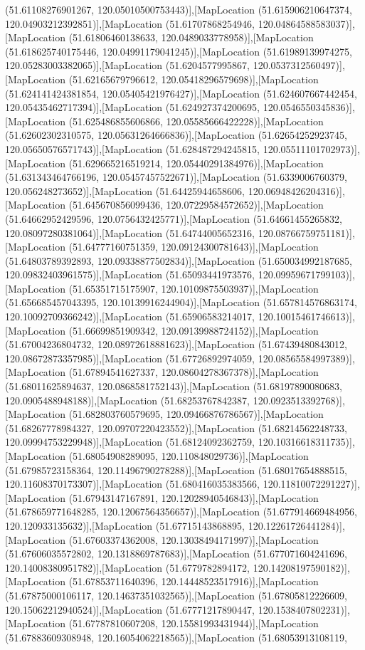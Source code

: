 (51.61108276901267, 120.05010500753443)],[MapLocation (51.615906210647374, 120.04903212392851)],[MapLocation (51.61707868254946, 120.04864588583037)],[MapLocation (51.61806460138633, 120.0489033778958)],[MapLocation (51.618625740175446, 120.04991179041245)],[MapLocation (51.61989139974275, 120.05283003382065)],[MapLocation (51.6204577995867, 120.0537312560497)],[MapLocation (51.62165679796612, 120.05418296579698)],[MapLocation (51.624141424381854, 120.05405421976427)],[MapLocation (51.624607667442454, 120.05435462717394)],[MapLocation (51.624927374200695, 120.0546550345836)],[MapLocation (51.625486855606866, 120.05585666422228)],[MapLocation (51.62602302310575, 120.05631264666836)],[MapLocation (51.62654252923745, 120.05650576571743)],[MapLocation (51.628487294245815, 120.05511101702973)],[MapLocation (51.629665216519214, 120.05440291384976)],[MapLocation (51.631343464766196, 120.05457457522671)],[MapLocation (51.6339006760379, 120.056248273652)],[MapLocation (51.64425944658606, 120.06948426204316)],[MapLocation (51.645670856099436, 120.07229584572652)],[MapLocation (51.64662952429596, 120.0756432425771)],[MapLocation (51.64661455265832, 120.08097280381064)],[MapLocation (51.64744005652316, 120.08766759751181)],[MapLocation (51.64777160751359, 120.09124300781643)],[MapLocation (51.64803789392893, 120.09338877502834)],[MapLocation (51.650034992187685, 120.09832403961575)],[MapLocation (51.65093441973576, 120.09959671799103)],[MapLocation (51.65351715175907, 120.10109875503937)],[MapLocation (51.656685457043395, 120.10139916244904)],[MapLocation (51.657814576863174, 120.10092709366242)],[MapLocation (51.65906583214017, 120.10015461746613)],[MapLocation (51.66699851909342, 120.09139988724152)],[MapLocation (51.67004236804732, 120.08972618881623)],[MapLocation (51.67439480843012, 120.08672873357985)],[MapLocation (51.67726892974059, 120.08565584997389)],[MapLocation (51.67894541627337, 120.08604278367378)],[MapLocation (51.68011625894637, 120.0868581752143)],[MapLocation (51.68197890080683, 120.0905488948188)],[MapLocation (51.68253767842387, 120.0923513392768)],[MapLocation (51.682803760579695, 120.09466876786567)],[MapLocation (51.68267778984327, 120.09707220423552)],[MapLocation (51.68214562248733, 120.09994753229948)],[MapLocation (51.68124092362759, 120.10316618311735)],[MapLocation (51.68054908289095, 120.110848029736)],[MapLocation (51.67985723158364, 120.11496790278288)],[MapLocation (51.68017654888515, 120.11608370173307)],[MapLocation (51.680416035383566, 120.11810072291227)],[MapLocation (51.67943147167891, 120.12028940546843)],[MapLocation (51.678659771648285, 120.12067564356657)],[MapLocation (51.677914669484956, 120.120933135632)],[MapLocation (51.67715143868895, 120.12261726441284)],[MapLocation (51.67603374362008, 120.13038494171997)],[MapLocation (51.67606035572802, 120.1318869787683)],[MapLocation (51.677071604241696, 120.14008380951782)],[MapLocation (51.6779782894172, 120.14208197590182)],[MapLocation (51.67853711640396, 120.14448523517916)],[MapLocation (51.67875000106117, 120.14637351032565)],[MapLocation (51.67805812226609, 120.15062212940524)],[MapLocation (51.67771217890447, 120.1538407802231)],[MapLocation (51.67787810607208, 120.15581993431944)],[MapLocation (51.67883609308948, 120.16054062218565)],[MapLocation (51.68053913108119, 